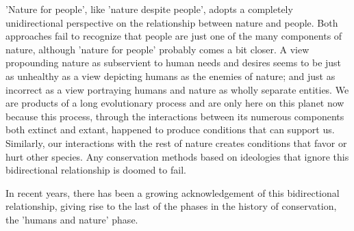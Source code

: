 \documentclass[rutwik_proposal.tex]{subfiles}
\begin{document}
'Nature for people', like 'nature despite people', adopts a completely unidirectional perspective on the relationship between nature and people. Both approaches fail to recognize that people are just one of the many components of nature, although 'nature for people' probably comes a bit closer. A view propounding nature as subservient to human needs and desires seems to be just as unhealthy as a view depicting humans as the enemies of nature; and just as incorrect as a view portraying humans and nature as wholly separate entities. We are products of a long evolutionary process and are only here on this planet now because this process, through the interactions between its numerous components both extinct and extant, happened to produce conditions that can support us. Similarly, our interactions with the rest of nature creates conditions that favor or hurt other species. Any conservation methods based on ideologies that ignore this bidirectional relationship is doomed to fail.

In recent years, there has been a growing acknowledgement of this bidirectional relationship, giving rise to the last of the phases in the history of conservation, the 'humans and nature' phase.
\end{document}

